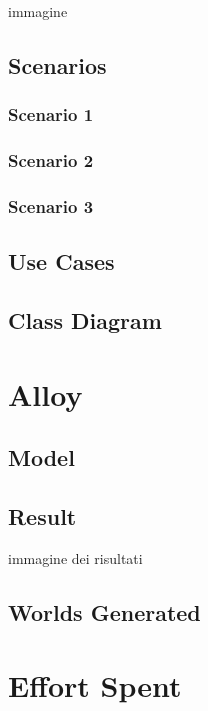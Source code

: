 \documentclass{article}
\begin{document}
immagine

\subsection{Scenarios}
\subsubsection{Scenario 1}

\subsubsection{Scenario 2}

\subsubsection{Scenario 3}

\clearpage
\subsection{Use Cases}




\clearpage
\subsection{Class Diagram}

\section{Alloy}
\subsection{Model}


\subsection{Result}
\begin{center}
	
	immagine dei risultati
\end{center}
\subsection{Worlds Generated}

\section{Effort Spent}
\end{document}
